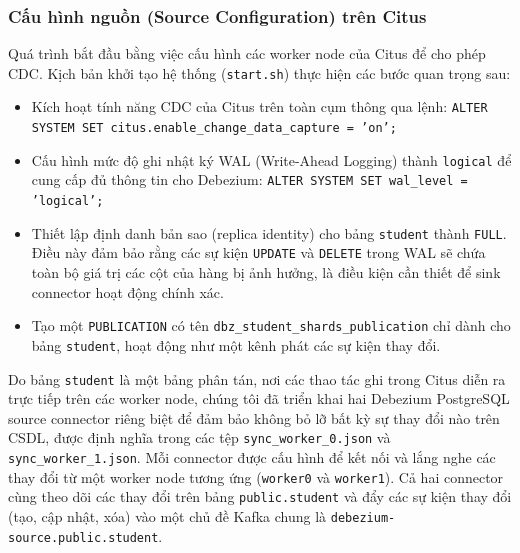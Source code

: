 \documentclass[conference]{IEEEtran}
\begin{document}
\subsubsection{Cấu hình nguồn (Source Configuration) trên Citus}
Quá trình bắt đầu bằng việc cấu hình các worker node của Citus để cho phép CDC. Kịch bản khởi tạo hệ thống (\texttt{start.sh}) thực hiện các bước quan trọng sau:
\begin{itemize}
    \item Kích hoạt tính năng CDC của Citus trên toàn cụm thông qua lệnh: \texttt{ALTER SYSTEM SET citus.enable\_change\_data\_capture = 'on';}
    \item Cấu hình mức độ ghi nhật ký WAL (Write-Ahead Logging) thành \texttt{logical} để cung cấp đủ thông tin cho Debezium: \texttt{ALTER SYSTEM SET wal\_level = 'logical';}
    \item Thiết lập định danh bản sao (replica identity) cho bảng \texttt{student} thành \texttt{FULL}. Điều này đảm bảo rằng các sự kiện \texttt{UPDATE} và \texttt{DELETE} trong WAL sẽ chứa toàn bộ giá trị các cột của hàng bị ảnh hưởng, là điều kiện cần thiết để sink connector hoạt động chính xác.
    \item Tạo một \texttt{PUBLICATION} có tên \texttt{dbz\_student\_shards\_publication} chỉ dành cho bảng \texttt{student}, hoạt động như một kênh phát các sự kiện thay đổi.
\end{itemize}
Do bảng \texttt{student} là một bảng phân tán, nơi các thao tác ghi trong Citus diễn ra trực tiếp trên các worker node, chúng tôi đã triển khai hai Debezium PostgreSQL source connector riêng biệt để đảm bảo không bỏ lỡ bất kỳ sự thay đổi nào trên CSDL, được định nghĩa trong các tệp \texttt{sync\_worker\_0.json} và \texttt{sync\_worker\_1.json}. Mỗi connector được cấu hình để kết nối và lắng nghe các thay đổi từ một worker node tương ứng (\texttt{worker0} và \texttt{worker1}). Cả hai connector cùng theo dõi các thay đổi trên bảng \texttt{public.student} và đẩy các sự kiện thay đổi (tạo, cập nhật, xóa) vào một chủ đề Kafka chung là \texttt{debezium-source.public.student}.
\end{document}
